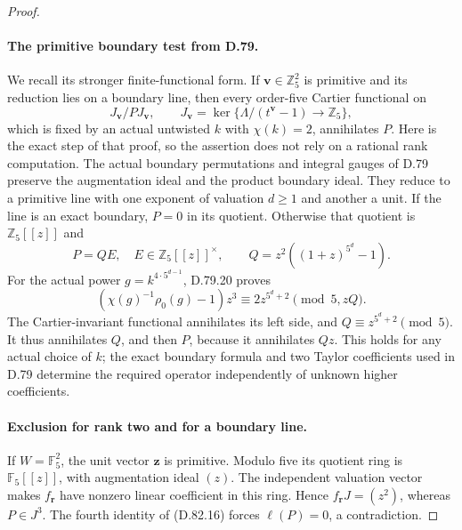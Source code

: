 \begin{proof}
\paragraph{The primitive boundary test from D.79.}
We recall its stronger finite-functional form. If
\(\mathbf v\in\mathbb Z_5^2\) is primitive and its reduction
lies on a boundary line, then every order-five
Cartier functional on
\[
 J_{\mathbf v}/P J_{\mathbf v},\qquad
 J_{\mathbf v}=\ker\{\Lambda/(t^{\mathbf v}-1)\to\mathbb Z_5\},
 \]
which is fixed by an actual untwisted \(k\) with \(\chi(k)=2\),
annihilates \(P\).
Here is the exact step of that proof, so the assertion does
not rely on a rational rank computation. The actual boundary
permutations and integral gauges of D.79 preserve the
augmentation ideal and the product boundary ideal.
They reduce to a primitive line with one exponent of
valuation \(d\ge1\) and another a unit. If the line is an
exact boundary, \(P=0\) in its quotient. Otherwise that
quotient is \(\mathbb Z_5[[z]]\) and
\[
 P=Q E,\quad E\in\mathbb Z_5[[z]]^\times,\qquad
 Q=z^2((1+z)^{5^d}-1).
 \]
For the actual power \(g=k^{4\cdot5^{d-1}}\), D.79.20 proves
\[
 (\chi(g)^{-1}\rho_0(g)-1)z^3
          \equiv2z^{5^d+2}\pmod{5,zQ}.
                                                               \tag{D.82.17}
\]
The Cartier-invariant functional annihilates its left side,
and \(Q\equiv z^{5^d+2}\pmod5\). It thus annihilates \(Q\),
and then \(P\), because it annihilates \(Qz\).
This holds for any actual choice of \(k\); the exact boundary
formula and two Taylor coefficients used in D.79 determine
the required operator independently of unknown higher coefficients.

\paragraph{Exclusion for rank two and for a boundary line.}
If \(W=\mathbb F_5^2\), the unit vector \(\mathbf z\)
is primitive. Modulo five its quotient ring is
\(\mathbb F_5[[z]]\), with augmentation ideal \((z)\).
The independent valuation vector makes \(f_{\mathbf r}\)
have nonzero linear coefficient in this ring. Hence
\(f_{\mathbf r}J=(z^2)\), whereas \(P\in J^3\).
The fourth identity of (D.82.16) forces \(\ell(P)=0\),
a contradiction.


\end{proof}

